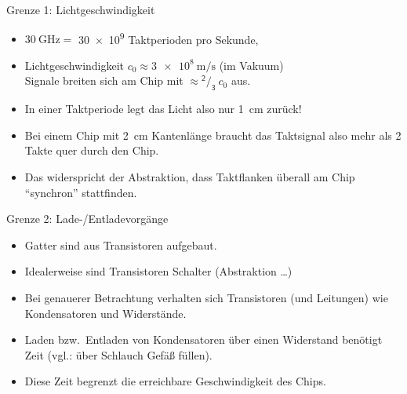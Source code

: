 \begin{frame}

	\begin{block}{Grenze 1: Lichtgeschwindigkeit \phantom{/}}

		\begin{itemize}
			\item $\SI{30}{\giga\hertz} =$ \num{30e9} Taktperioden pro
				Sekunde,
			\item Lichtgeschwindigkeit 	$c_0 \approx
				\SI{3e8}{\meter\per\second}$ (im Vakuum)\\
				Signale breiten sich am Chip mit $\approx \mathsf{^2/_3}~c_0$ aus.
			\item<2-> \alert<2>{In einer Taktperiode legt das Licht also nur
					\SI{1}{\centi\meter} zurück!}
				\item<3-> Bei einem Chip mit \SI{2}{\centi\meter} Kantenlänge
					braucht das Taktsignal also mehr als 2 Takte quer durch
					den Chip.
				\item<3-> Das widerspricht der Abstraktion, dass Taktflanken
					überall am Chip ``synchron'' stattfinden.
			\end{itemize}
		\end{block}

\end{frame}



\begin{frame}

	\begin{block}{Grenze 2: Lade-/Entladevorgänge}

		\begin{itemize}
			\item Gatter sind aus Transistoren aufgebaut.
			\item Idealerweise sind Transistoren Schalter (Abstraktion \ldots)
			\item Bei genauerer Betrachtung verhalten sich Transistoren (und
				Leitungen) wie Kondensatoren und Widerstände.
			\item Laden bzw.\ Entladen von Kondensatoren über einen Widerstand
				benötigt Zeit (vgl.: über Schlauch Gefäß füllen).
			\item Diese Zeit begrenzt die erreichbare Geschwindigkeit des
				Chips.
		\end{itemize}
	\end{block}
\end{frame}


